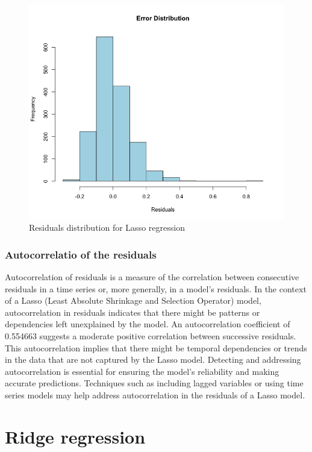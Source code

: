 \documentclass[10pt]{article} %
\begin{document}
    \begin{figure}[h]
        \centering
        \includegraphics[scale=0.45]{Assets/Errors lasso.png}
        \caption{Residuals distribution for Lasso regression}
        \label{fig:enter-label}
    \end{figure}
    \newpage
    \subsubsection{Autocorrelatio of the residuals}
    Autocorrelation of residuals is a measure of the correlation between consecutive residuals in a time series or, more generally, in a model's residuals. In the context of a Lasso (Least Absolute Shrinkage and Selection Operator) model, autocorrelation in residuals indicates that there might be patterns or dependencies left unexplained by the model. An autocorrelation coefficient of 0.554663 suggests a moderate positive correlation between successive residuals. This autocorrelation implies that there might be temporal dependencies or trends in the data that are not captured by the Lasso model. Detecting and addressing autocorrelation is essential for ensuring the model's reliability and making accurate predictions. Techniques such as including lagged variables or using time series models may help address autocorrelation in the residuals of a Lasso model.

    \section{Ridge regression}
\end{document}
